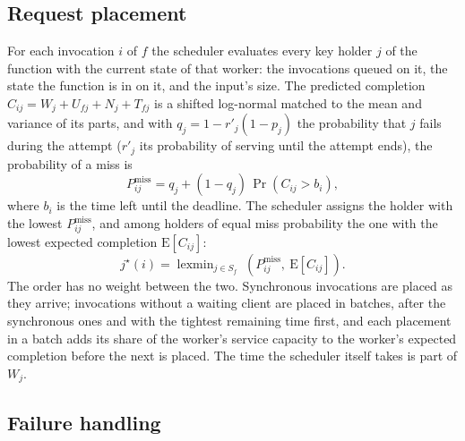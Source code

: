 \subsection{Request placement}
\label{sec:place}

For each invocation $i$ of $f$ the scheduler evaluates every key holder $j$ of the function with the current state
of that worker: the invocations queued on it, the state the function is in on it, and the input's size. The predicted
completion $C_{ij} = W_j + U_{fj} + N_j + T_{fj}$ is a shifted log-normal matched to the mean and variance of its
parts, and with $q_j = 1 - r'_j(1-p_j)$ the probability that $j$ fails during the attempt ($r'_j$ its probability of
serving until the attempt ends), the probability of a miss is
\begin{equation}
P^{\mathrm{miss}}_{ij} = q_j + (1 - q_j)\,\Pr\!\left(C_{ij} > b_i\right),
\label{eq:pmiss}
\end{equation}
where $b_i$ is the time left until the deadline. The scheduler assigns the holder with the lowest
$P^{\mathrm{miss}}_{ij}$, and among holders of equal miss probability the one with the lowest expected completion
$\mathrm{E}[C_{ij}]$:
\begin{equation}
j^\star(i) = \operatorname{lexmin}_{j \in S_f}\; \left(P^{\mathrm{miss}}_{ij},\ \mathrm{E}[C_{ij}]\right).
\label{eq:place}
\end{equation}
The order has no weight between the two. Synchronous invocations are placed as they
arrive; invocations without a waiting client are placed in batches, after the synchronous ones and with the tightest
remaining time first, and each placement in a batch adds its share of the worker's service capacity to the worker's expected
completion before the next is placed. The time the scheduler itself takes is part of $W_j$.

\subsection{Failure handling}
\label{sec:fail}

